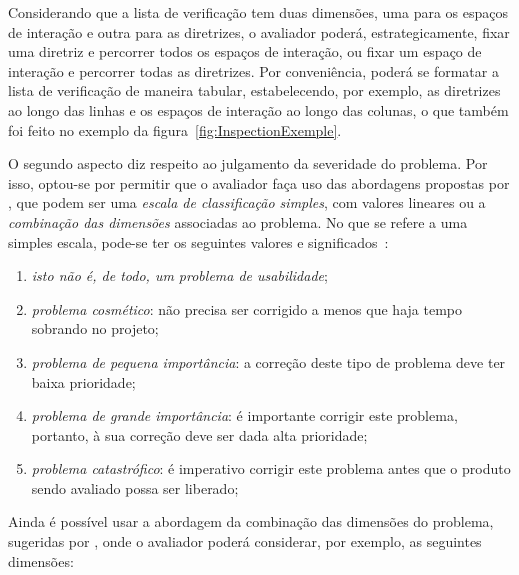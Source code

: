 Considerando que a  lista de verificação tem duas  dimensões, uma para
os  espaços de  interação  e  outra para  as  diretrizes, o  avaliador
poderá,  estrategicamente, fixar  uma  diretriz e  percorrer todos  os
espaços  de interação,  ou fixar  um espaço  de interação  e percorrer
todas as diretrizes.  Por conveniência,  poderá se formatar a lista de
verificação  de  maneira   tabular,  estabelecendo,  por  exemplo,  as
diretrizes ao longo das linhas e  os espaços de interação ao longo das
colunas,    o    que    também     foi    feito    no    exemplo    da
figura~\ref{fig:InspectionExemple}.

O  segundo  aspecto  diz  respeito  ao  julgamento  da  severidade  do
problema.  Por  isso, optou-se por  permitir que o avaliador  faça uso
das abordagens propostas  por , que podem ser
uma {\em escala  de classificação simples}, com valores  lineares ou a
{\em  combinação das  dimensões} associadas  ao problema.   No  que se
refere  a uma  simples  escala,  pode-se ter  os  seguintes valores  e
significados~\cite[p.~103]{Nielsen:1993}:

\begin{enumerate}[start=0]

  \item {\em isto não é, de todo, um problema de usabilidade};

  \item {\em  problema cosmético}: não  precisa ser corrigido  a menos
    que haja tempo sobrando no projeto;

  \item {\em  problema de pequena importância}: a  correção deste tipo
    de problema deve ter baixa prioridade;

  \item {\em  problema de  grande importância}: é  importante corrigir
    este  problema,  portanto,  à  sua  correção deve  ser  dada  alta
    prioridade;

  \item  {\em  problema  catastrófico}:  é  imperativo  corrigir  este
    problema antes que o produto sendo avaliado possa ser liberado;
\end{enumerate}

Ainda  é possível  usar a  abordagem  da combinação  das dimensões  do
problema,  sugeridas  por  ,  onde  o
avaliador poderá considerar, por exemplo, as seguintes dimensões:

